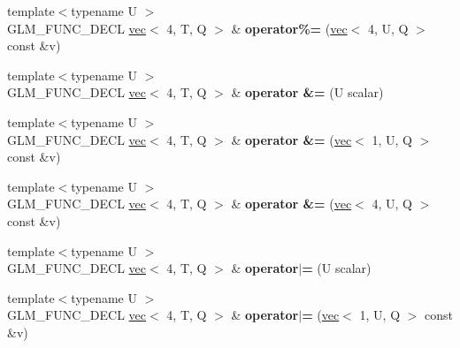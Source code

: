 \begin{DoxyCompactItemize}
\item 
\mbox{\label{structglm_1_1vec_3_014_00_01T_00_01Q_01_4_a10da98a89881a5135b526ceaa75c6f13}} 
{\footnotesize template$<$typename U $>$ }\\G\+L\+M\+\_\+\+F\+U\+N\+C\+\_\+\+D\+E\+CL \hyperlink{structglm_1_1vec}{vec}$<$ 4, T, Q $>$ \& {\bfseries operator\%=} (\hyperlink{structglm_1_1vec}{vec}$<$ 4, U, Q $>$ const \&v)
\item 
\mbox{\label{structglm_1_1vec_3_014_00_01T_00_01Q_01_4_a16aab24048ca1e0f7508c80daad228ca}} 
{\footnotesize template$<$typename U $>$ }\\G\+L\+M\+\_\+\+F\+U\+N\+C\+\_\+\+D\+E\+CL \hyperlink{structglm_1_1vec}{vec}$<$ 4, T, Q $>$ \& {\bfseries operator \&=} (U scalar)
\item 
\mbox{\label{structglm_1_1vec_3_014_00_01T_00_01Q_01_4_a0367ad867801ac2e7112bfe8a95e996e}} 
{\footnotesize template$<$typename U $>$ }\\G\+L\+M\+\_\+\+F\+U\+N\+C\+\_\+\+D\+E\+CL \hyperlink{structglm_1_1vec}{vec}$<$ 4, T, Q $>$ \& {\bfseries operator \&=} (\hyperlink{structglm_1_1vec}{vec}$<$ 1, U, Q $>$ const \&v)
\item 
\mbox{\label{structglm_1_1vec_3_014_00_01T_00_01Q_01_4_adc70eea7b85cb2849ff51803b85f1605}} 
{\footnotesize template$<$typename U $>$ }\\G\+L\+M\+\_\+\+F\+U\+N\+C\+\_\+\+D\+E\+CL \hyperlink{structglm_1_1vec}{vec}$<$ 4, T, Q $>$ \& {\bfseries operator \&=} (\hyperlink{structglm_1_1vec}{vec}$<$ 4, U, Q $>$ const \&v)
\item 
\mbox{\label{structglm_1_1vec_3_014_00_01T_00_01Q_01_4_a406f2bfe72cf1f25af84f3dc84a43b27}} 
{\footnotesize template$<$typename U $>$ }\\G\+L\+M\+\_\+\+F\+U\+N\+C\+\_\+\+D\+E\+CL \hyperlink{structglm_1_1vec}{vec}$<$ 4, T, Q $>$ \& {\bfseries operator$\vert$=} (U scalar)
\item 
\mbox{\label{structglm_1_1vec_3_014_00_01T_00_01Q_01_4_a147590be4731c2b2236f56d11019498f}} 
{\footnotesize template$<$typename U $>$ }\\G\+L\+M\+\_\+\+F\+U\+N\+C\+\_\+\+D\+E\+CL \hyperlink{structglm_1_1vec}{vec}$<$ 4, T, Q $>$ \& {\bfseries operator$\vert$=} (\hyperlink{structglm_1_1vec}{vec}$<$ 1, U, Q $>$ const \&v)

\end{DoxyCompactItemize}
